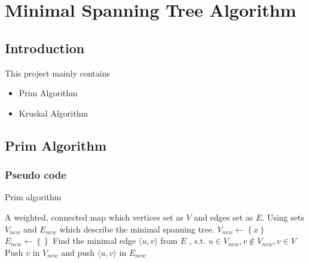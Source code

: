 \documentclass[cs4size, punct, nospace, fancyhdr, fntef]{ctexart}
\begin{document}
  \section{Minimal Spanning Tree Algorithm}

  \subsection{Introduction}
    This project mainly contains
    \begin{itemize}
      \item Prim Algorithm
      \item Kruskal Algorithm
    \end{itemize}
  \subsection{Prim Algorithm}
    \subsubsection{Pseudo code}
      \begin{algorithm}
      \caption{Prim algorithm}\label{prim}
      \begin{algorithmic}[1]
        \Require A weighted, connected map which vertices set as $V$ and edges set as $E$.
        \Ensure Using sets $V_{new}$ and $E_{new}$ which describe the minimal spanning tree.
        \State $V_{new}\gets\left\{x\right\}$
        \State $E_{new}\gets \left\{\right\}$
          \State Find the minimal edge $\langle u, v\rangle$ from $E$ , s.t. $u\in V_{new}, v\notin V_{new}, v \in V$ 
          \State Push $v$ in $V_{new}$ and push $\langle u, v\rangle$ in $E_{new}$
        \EndWhile
      \EndFunction
      \end{algorithmic}
      \end{algorithm}
\end{document}
